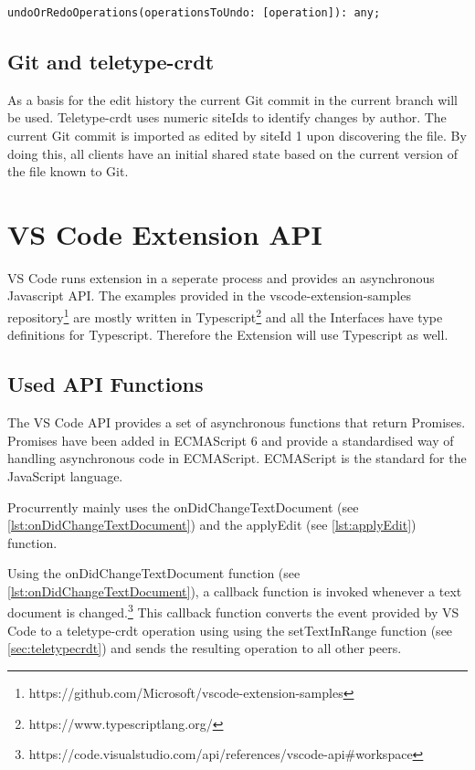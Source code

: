 \begin{lstlisting}[label={lst:undoOrRedoOperations}, caption=teletype-crdt undoOrRedoOperations]
undoOrRedoOperations(operationsToUndo: [operation]): any;
\end{lstlisting}

\subsection{Git and teletype-crdt}
As a basis for the edit history  the current Git commit in the current branch will be used. Teletype-crdt uses numeric siteIds to identify changes by author. The current Git commit is imported as edited by siteId 1 upon discovering the file. By doing this, all clients have an initial shared state based on the current version of the file known to Git.

\section{VS Code Extension API}

VS Code runs extension in a seperate process and provides an asynchronous Javascript API.
The examples provided in the vscode-extension-samples repository\footnote{https://github.com/Microsoft/vscode-extension-samples} are mostly written in Typescript\footnote{https://www.typescriptlang.org/} and all the Interfaces have type definitions for Typescript.
Therefore the Extension will use Typescript as well.

\subsection{Used API Functions}

The VS Code API provides a set of asynchronous functions that return Promises. Promises have been added in ECMAScript 6 and provide a standardised way of handling asynchronous code in ECMAScript.\cite{Madsen:2017:MRJ:3152284.3133910} ECMAScript is the standard for the JavaScript language.

Procurrently mainly uses the onDidChangeTextDocument (see \autoref{lst:onDidChangeTextDocument}) and the applyEdit (see \autoref{lst:applyEdit}) function. 

Using the onDidChangeTextDocument function (see \autoref{lst:onDidChangeTextDocument}), a callback function is invoked whenever a text document is changed.\footnote{https://code.visualstudio.com/api/references/vscode-api\#workspace} This callback function converts the event provided by VS Code to a teletype-crdt operation using using the setTextInRange function (see \autoref{sec:teletypecrdt}) and sends the resulting operation to all other peers.

